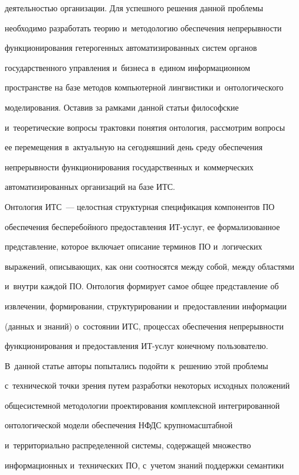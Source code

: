 деятельностью организации. Для успешного решения данной проблемы


необходимо разработать тео\-рию и~методологию обеспечения непрерывности


функционирования гетерогенных автоматизированных систем органов


государственного управ\-ле\-ния и~бизнеса в~едином информационном


пространстве на базе методов компьютерной лингвистики и~онтологического


моделирования. Оставив за рамками данной статьи философские


и~тео\-ре\-ти\-че\-ские вопросы трактовки понятия онтология, рассмотрим вопросы


ее перемещения в~актуальную на сегодняшний день среду обеспечения


непрерывности функционирования государственных и~коммерческих


автоматизированных организаций на базе ИТС.





  Онтология ИТС~--- целостная структурная спецификация компонентов ПО


обеспечения бесперебойного предоставления ИТ-услуг, ее формализованное


представление, которое включает описание терминов ПО и~логических


выражений, описывающих, как они соотносятся между собой, между областями


и~внутри каждой ПО. Онтология формирует самое общее представление об


извлечении, формировании, структурировании и~предоставлении информации


(данных и знаний) о~состоянии ИТС, процессах обеспечения непрерывности


функционирования и предоставления ИТ-услуг конечному пользователю.


В~данной статье авторы попытались подойти к~решению этой проблемы


с~технической точки зрения путем разработки некоторых исходных положений


общесистемной методологии проектирования комплексной интегрированной


онтологической модели обеспечения НФДС крупномасштабной


и~территориально распределенной системы, содержащей множество


информационных и~технических ПО, с~учетом знаний поддержки семантики


